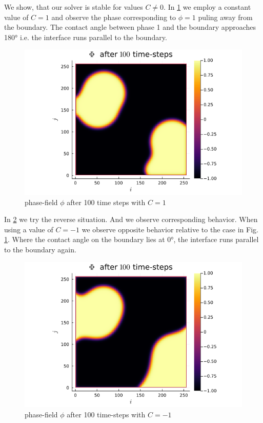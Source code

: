 \documentclass{mimosis}
\begin{document}
We show, that our solver is stable for values \(C \neq 0\). In \ref{fig:angle1} we employ a constant value of \(C=1\) and observe the phase corresponding to \(\phi = 1\) puling away from the boundary. The contact angle between phase 1 and the boundary approaches 180° i.e. the interface runs parallel to the boundary.
\begin{figure}[htbp]
\centering
\includegraphics[width=.9\linewidth]{images/angle1.png}
\caption{\label{fig:angle1}phase-field   \(\phi\) after 100 time steps with \(C=1\)}
\end{figure}


In \ref{fig:angle-1} we try the reverse situation. And we observe corresponding behavior. When using a value of \(C=-1\) we observe opposite behavior relative to the case in Fig. \ref{fig:angle1}. Where the contact angle on the boundary lies at 0°, the interface runs parallel to the boundary again.
\begin{figure}[htbp]
\centering
\includegraphics[width=.9\linewidth]{images/angle-.png}
\caption{\label{fig:angle-1}phase-field \(\phi\) after 100 time-steps with \(C=-1\)}
\end{figure}
\end{document}
